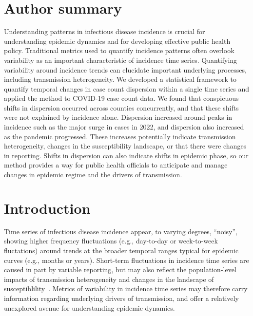 \documentclass[11pt,letterpaper]{article}
\begin{document}
\begin{Abstract}
\section*{Author summary}
Understanding patterns in infectious disease incidence is crucial for understanding epidemic dynamics and for developing effective public health policy.
Traditional metrics used to quantify incidence patterns often overlook variability as an important characteristic of incidence time series. 
Quantifying variability around incidence trends can elucidate important underlying processes, including transmission heterogeneity.
We developed a statistical framework to quantify temporal changes in case count dispersion within a single time series and applied the method to COVID-19 case count data. 
We found that conspicuous shifts in dispersion occurred across counties concurrently, and that these shifts were not explained by incidence alone. 
Dispersion increased around peaks in incidence such as the major surge in cases in 2022, and dispersion also increased as the pandemic progressed. 
These increases potentially indicate transmission heterogeneity, changes in the susceptibility landscape, or that there were changes in reporting.
Shifts in dispersion can also indicate shifts in epidemic phase, so our method provides a way for public health officials to anticipate and manage changes in epidemic regime and the drivers of transmission. 

\clearpage
\section*{Introduction}
Time series of infectious disease incidence appear, to varying degrees, ``noisy'', showing higher frequency fluctuations (e.g., day-to-day or week-to-week fluctations) around trends at the broader temporal ranges typical for epidemic curves (e.g., months or years).
Short-term fluctuations in incidence time series are caused in part by variable reporting, but may also reflect the population-level impacts of transmission heterogeneity and changes in the landscape of susceptiblility~\citep{lloyd2005superspreading,lloyd2007maximum, lau2017spatial, dalziel2018urbanization, kirkegaard2021superspreading, sun2021transmission,guo2023statistical,ko2023time}.
Metrics of variability in incidence time series may therefore carry information regarding underlying drivers of transmission, and offer a relatively unexplored avenue for understanding epidemic dynamics. 


\end{Abstract}
\end{document}
